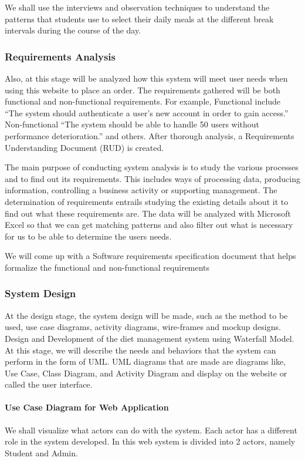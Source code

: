 \documentclass{article}
\begin{document}
We shall use the interviews and observation techniques to understand the patterns that students use to select their daily meals at the different break intervals during the course of the day.

\subsubsection{Requirements Analysis}
Also, at this stage will be analyzed how this system will meet user needs when using this website to place an order. The requirements gathered will be both functional and non-functional requirements. For example, Functional include “The system should authenticate a user’s new account in order to gain access.” Non-functional “The system should be able to handle 50 users without performance deterioration.” and others. After thorough analysis, a Requirements Understanding Document (RUD) is created.

The main purpose of conducting system analysis is to study the various processes and to find out its requirements. This includes ways of processing data, producing information, controlling a business activity or supporting management. The determination of requirements entrails studying the existing details about it to find out what these requirements are. The data will be analyzed with Microsoft Excel so that we can get matching patterns and also filter out what is necessary for us to be able to determine the users needs.

We will come up with a Software requirements specification document that helps formalize the functional and non-functional requirements

\subsubsection{System Design}
At the design stage, the system design will be made, such as the method to be used, use case diagrams, activity diagrams, wire-frames and mockup designs. Design and Development of the diet management system using Waterfall Model. At this stage, we will describe the needs and behaviors that the system can perform in the form of UML. UML diagrams that are made are diagrams like, Use Case, Class Diagram, and Activity Diagram and display on the website or called the user interface.

\paragraph{Use Case Diagram for Web Application\\}
We shall visualize what actors can do with the system. Each actor has a different role in the system developed. In this web system is divided into 2 actors, namely Student and Admin.
\end{document}

